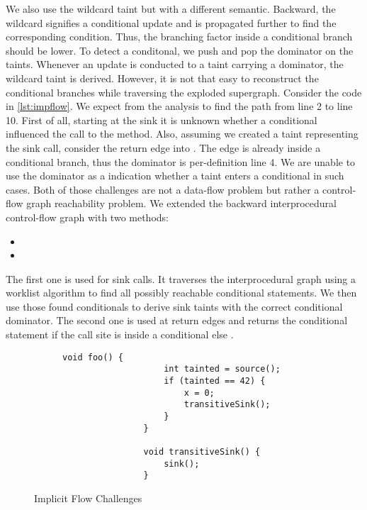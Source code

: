 \documentclass[../draft.tex]{subfiles}
\begin{document}
    We also use the wildcard taint but with a different semantic. 
    Backward, the wildcard signifies a conditional update and is propagated further to find the corresponding condition.
    Thus, the branching factor inside a conditional branch should be lower. 
    To detect a conditonal, we push and pop the dominator on the taints.
    Whenever an update is conducted to a taint carrying a dominator, the wildcard taint is derived.
    However, it is not that easy to reconstruct the conditional branches while traversing the exploded supergraph.
    Consider the code in \autoref{lst:impflow}. 
    We expect from the analysis to find the path from line 2 to line 10. 
    First of all, starting at the sink it is unknown whether a conditional influenced the call to the  method. 
    Also, assuming we created a taint representing the sink call, consider the return edge into . 
    The edge is already inside a conditional branch, thus the dominator is per-definition line 4. 
    We are unable to use the dominator as a indication whether a taint enters a conditional in such cases.
    Both of those challenges are not a data-flow problem but rather a control-flow graph reachability problem. 
    We extended the backward interprocedural control-flow graph with two methods:
    \begin{itemize}
        \item {}
        \item {}
    \end{itemize}
    The first one is used for sink calls. 
    It traverses the interprocedural graph using a worklist algorithm to find all possibly reachable conditional statements. 
    We then use those found conditionals to derive sink taints with the correct conditional dominator.
    The second one is used at return edges and returns the conditional statement if the call site is inside a conditional else . 
    
    \begin{figure}[tbp]
        \centering
        \begin{subfigure}[b]{0.45\textwidth}
            \centering
            \begin{lstlisting}[gobble=16]
                void foo() {
                    int tainted = source();
                    if (tainted == 42) {
                        x = 0;
                        transitiveSink();
                    }
                }

                void transitiveSink() {
                    sink();
                }
            \end{lstlisting}
        \end{subfigure}
        \caption{Implicit Flow Challenges}
        \label{lst:impflow}
    \end{figure}
\end{document}
